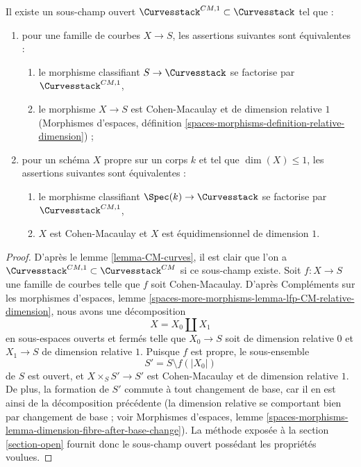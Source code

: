 \begin{lemma}
\label{lemma-CM-1-curves}
Il existe un sous-champ ouvert $\Curvesstack^{CM, 1} \subset \Curvesstack$
tel que :
\begin{enumerate}
\item pour une famille de courbes $X \to S$, les assertions suivantes
sont équivalentes :
\begin{enumerate}
\item le morphisme classifiant $S \to \Curvesstack$ se factorise par
$\Curvesstack^{CM, 1}$,
\item le morphisme $X \to S$ est Cohen-Macaulay et de dimension
relative $1$ (Morphismes d'espaces, définition
\ref{spaces-morphisms-definition-relative-dimension}) ;
\end{enumerate}
\item pour un schéma $X$ propre sur un corps $k$ et tel que $\dim(X) \leq 1$,
les assertions suivantes sont équivalentes :
\begin{enumerate}
\item le morphisme classifiant $\Spec(k) \to \Curvesstack$ se factorise
par $\Curvesstack^{CM, 1}$,
\item $X$ est Cohen-Macaulay et $X$ est équidimensionnel de dimension $1$.
\end{enumerate}
\end{enumerate}
\end{lemma}

\begin{proof}
D'après le lemme \ref{lemma-CM-curves}, il est clair que l'on a
$\Curvesstack^{CM, 1} \subset \Curvesstack^{CM}$ si ce sous-champ existe.
Soit $f : X \to S$ une famille de courbes telle que $f$ soit
Cohen-Macaulay. D'après Compléments sur les morphismes d'espaces, lemme
\ref{spaces-more-morphisms-lemma-lfp-CM-relative-dimension},
nous avons une décomposition
$$
X = X_0 \amalg X_1
$$
en sous-espaces ouverts et fermés telle que $X_0 \to S$ soit de dimension
relative $0$ et $X_1 \to S$ de dimension relative $1$.
Puisque $f$ est propre, le sous-ensemble
$$
S' = S \setminus f(|X_0|)
$$
de $S$ est ouvert, et $X \times_S S' \to S'$ est Cohen-Macaulay
et de dimension relative $1$.
De plus, la formation de $S'$ commute à tout changement de base,
car il en est ainsi de la décomposition précédente (la dimension relative
se comportant bien par changement de base ; voir Morphismes d'espaces, lemme
\ref{spaces-morphisms-lemma-dimension-fibre-after-base-change}).
La méthode exposée à la section \ref{section-open} fournit donc le sous-champ
ouvert possédant les propriétés voulues.
\end{proof}






